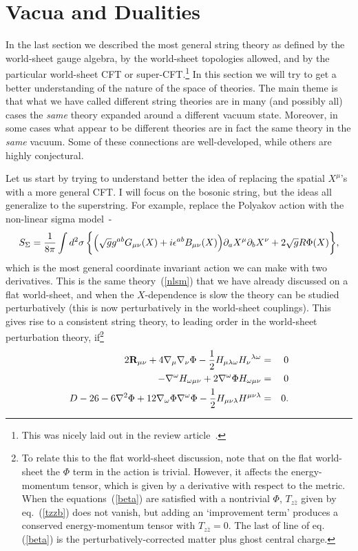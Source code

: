 \section{Vacua and Dualities}
\setcounter{footnote}{0}


In the last section we described the most general string theory as
defined by the world-sheet gauge algebra, by the world-sheet
topologies allowed, and by the particular world-sheet CFT or
super-CFT.\footnote{This was nicely laid out in the review
article~\cite{Sclass}.}
In this section we will try to get a better
understanding of the nature of the space of theories.  The main
theme is that what we have called different
string theories are in many (and possibly all) cases the {\it same}
theory expanded around a different vacuum state.  Moreover, in
some cases what appear to be different theories are in fact 
the same theory in the {\it same} vacuum.  Some of
these connections are well-developed, while others are highly
conjectural.

Let us start by trying to understand better the idea of replacing
the spatial $X^\mu$'s with a more general CFT.
I will focus on the bosonic string, but the ideas all generalize
to the superstring.  For example,  replace the Polyakov action with
the non-linear sigma model~\cite{Fnlsm}-\cite{CFMP}
\begin{equation}
S_{\Sigma} = \frac{1}{8 \pi }\int d^2\sigma \, \biggl\{  
\Bigl(\sqrt{g} g^{ab} G_{\mu\nu} (X) + i \epsilon^{ab} B_{\mu\nu} (X)
\Bigr) \partial_a X^\mu \partial_b X^\nu 
+ 2 \sqrt{g} R \Phi(X) \biggr\}, 
\end{equation}
which is the most general coordinate invariant action we can make
with two derivatives.  This is the same theory~(\ref{nlsm}) that
we have already discussed on a flat world-sheet, and when the
$X$-dependence is slow the theory can be studied perturbatively
(this is now perturbatively in the world-sheet couplings).
This gives rise to a consistent string theory, to leading order
in the world-sheet perturbation theory, if\footnote
{To relate this to the flat world-sheet discussion, note that
on the flat world-sheet the $\Phi$ term in the action is trivial.
However, it affects the energy-momentum tensor, which is given by a
derivative with respect to the metric.  When the
equations~(\ref{beta}) are satisfied with a nontrivial $\Phi$,
$T_{z\bar z}$ given by eq.~(\ref{tzzb}) does not vanish, but
adding an `improvement term' produces a conserved energy-momentum
tensor with $T_{z\bar z} = 0$.  The last of line of
eq.(\ref{beta}) is the perturbatively-corrected matter plus ghost
central charge.}
\begin{eqnarray} 2 {\bf{ R}}_{\mu\nu}
 + 4 \nabla_\mu \nabla_\nu \Phi
-\frac{1}{2}H_{\mu \lambda \omega}H_\nu{}^{\lambda \omega}
& = & 0 \nonumber \\
- \nabla^\omega H_{\omega \mu \nu}
+ 2 \nabla^\omega \Phi H_{\omega \mu \nu} &=& 0
 \nonumber \\
D - 26 - 6\nabla^2 \Phi +
12 \nabla_\omega \Phi \nabla^\omega \Phi - \frac{1}{2} H_{\mu
\nu \lambda}H^{\mu\nu\lambda} &=& 0. \label{beta}
\end{eqnarray}

